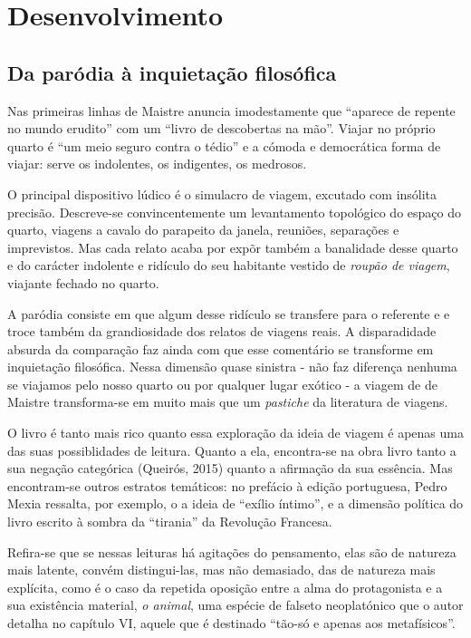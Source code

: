 \documentclass[12pt]{article}
\begin{document}
\section{Desenvolvimento}

\subsection{Da paródia à inquietação filosófica}

Nas primeiras linhas de Maistre anuncia imodestamente que ``aparece de repente no mundo erudito'' com um ``livro de descobertas na mão''. Viajar no próprio quarto é ``um meio seguro contra o tédio'' e a cómoda e democrática forma de viajar: serve os indolentes, os indigentes, os medrosos.

O principal dispositivo lúdico é o simulacro de viagem, excutado com insólita precisão. Descreve-se convincentemente um levantamento  topológico do espaço do quarto, viagens a cavalo do parapeito da janela, reuniões, separações e imprevistos. Mas cada relato acaba por expõr também a banalidade desse quarto e do carácter indolente e ridículo do seu habitante vestido de \emph{roupão de viagem}, viajante fechado no quarto.

A paródia consiste em que algum desse ridículo se transfere para o referente e e troce também da grandiosidade dos relatos de viagens reais. A disparadidade absurda da comparação faz ainda com que esse comentário se transforme em inquietação filosófica. Nessa dimensão quase sinistra - não faz diferença nenhuma se viajamos pelo nosso quarto ou por qualquer lugar exótico - a viagem de de Maistre transforma-se em muito mais que um \emph{pastiche} da literatura de viagens.

O livro é tanto mais rico quanto essa exploração da ideia de viagem é apenas uma das suas possiblidades de leitura. Quanto a ela, encontra-se na obra livro tanto a sua negação categórica (Queirós, 2015) quanto a afirmação da sua essência. Mas encontram-se outros estratos temáticos: no prefácio à edição portuguesa, Pedro Mexia ressalta, por exemplo, o a ideia de ``exílio íntimo'', e a dimensão política do livro escrito à sombra da ``tirania'' da Revolução Francesa.

Refira-se que se nessas leituras há agitações do pensamento, elas são de natureza mais latente, convém distingui-las, mas não demasiado, das de natureza mais explícita, como é o caso da repetida oposição entre a alma do protagonista e a sua existência material, \emph{o animal}, uma espécie de falseto neoplatónico que o autor detalha no capítulo VI, aquele que é destinado ``tão-só e apenas aos metafísicos''.
\end{document}
